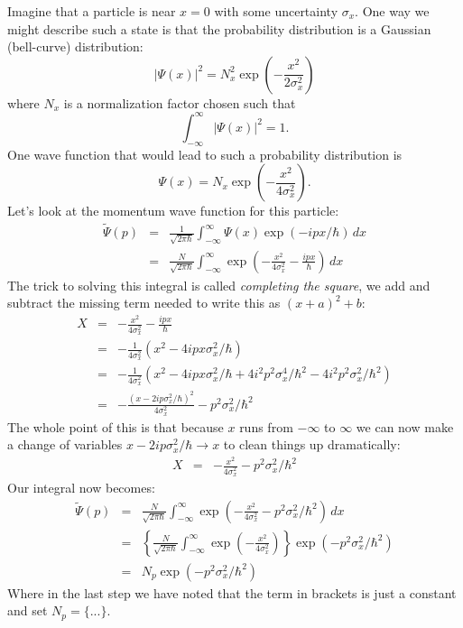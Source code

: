 \documentclass[12pt,oneside]{book}
\begin{document}
Imagine that a particle is near $x=0$ with some uncertainty $\sigma_x$.  One way we might describe such a state is that the probability distribution is a Gaussian (bell-curve) distribution:
\begin{displaymath}
|\Psi(x)|^2 = N_x^2 \exp\left(-\frac{x^2}{2\sigma_x^2}\right)
\end{displaymath}
where $N_x$ is a normalization factor chosen such that 
\begin{displaymath}
\int_{-\infty}^{\infty} |\Psi(x)|^2 = 1.
\end{displaymath}
One wave function that would lead to such a probability distribution is 
\begin{displaymath}
\Psi(x) = N_x \exp\left(-\frac{x^2}{4\sigma_x^2}\right).
\end{displaymath}
Let's look at the momentum wave function for this particle:
\begin{eqnarray} 
\widetilde{\Psi}(p) &=&  \frac{1}{\sqrt{2\pi\hbar}} \int_{-\infty}^{\infty} {\Psi}(x) \exp(-ipx/\hbar) \, dx \\
&=&  \frac{N}{\sqrt{2\pi\hbar}} \int_{-\infty}^{\infty}  \exp \left(-\frac{x^2}{4\sigma_x^2} - \frac{ipx}{\hbar}\right) \, dx
\end{eqnarray}
The trick to solving this integral is called {\em completing the square}, we add and subtract the missing term needed to write this as $(x+a)^2 + b$:
\begin{eqnarray*} 
X &=&  -\frac{x^2}{4\sigma_x^2} - \frac{ipx}{\hbar} \\
&=&  -\frac{1}{4\sigma_x^2}(x^2 - 4ipx\sigma_x^2/\hbar) \\
&=&  -\frac{1}{4\sigma_x^2}(x^2 - 4ipx\sigma_x^2/\hbar  + 4i^2p^2\sigma_x^4/\hbar^2 - 4i^2p^2\sigma_x^2/\hbar^2) \\
&=&  -\frac{(x - 2 i p\sigma_x^2/\hbar)^2}{4\sigma_x^2} - p^2\sigma_x^2/\hbar^2
\end{eqnarray*}
The whole point of this is that because $x$ runs from $-\infty$ to $\infty$ we can now make a change of variables $x - 2 i p\sigma_x^2/\hbar \to x$ to clean things up dramatically:
\begin{eqnarray*} 
X &=&  -\frac{x^2}{4\sigma_x^2} - p^2\sigma_x^2/\hbar^2
\end{eqnarray*}
Our integral now becomes:
\begin{eqnarray} 
\widetilde{\Psi}(p) &=&  \frac{N}{\sqrt{2\pi\hbar}} \int_{-\infty}^{\infty}  \exp \left( -\frac{x^2}{4\sigma_x^2} - p^2\sigma_x^2/\hbar^2 \right) \, dx \nonumber \\
&=& \left\{ \frac{N}{\sqrt{2\pi\hbar}} \int_{-\infty}^{\infty}  \exp \left( -\frac{x^2}{4\sigma_x^2} \right) \right\} \exp\left( - p^2\sigma_x^2/\hbar^2 \right) \nonumber \\
&=& N_p \exp(-p^2 \sigma_x^2/\hbar^2) \label{eqn:psip}
\end{eqnarray}
Where in the last step we have noted that the term in brackets is just a constant and set $N_p=\{...\}$.
\end{document}
